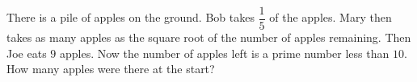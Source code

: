 There is a pile of apples on the ground. Bob takes $\dfrac15$ of the apples. Mary then takes as many apples as the square root of the number of apples remaining. Then Joe eats $9$ apples. Now the number of apples left is a prime number less than $10$. How many apples were there at the start?
